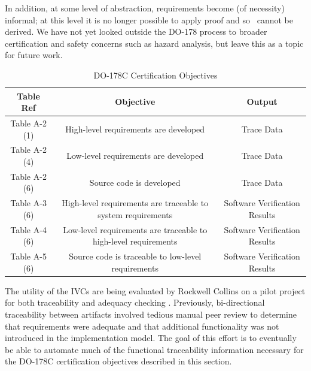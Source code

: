 In addition, at some level of abstraction, requirements become (of necessity) informal; at this level it is no longer possible to apply proof and so \mivcs\ cannot be derived.  We have not yet looked outside the DO-178 process to broader certification and safety concerns such as hazard analysis, but leave this as a topic for future work.

\begin{table}
  \caption{DO-178C Certification Objectives}
  \centering
  \begin{tabular}{ |c|c|c| }
    \hline
     Table Ref & Objective & Output  \\[0.5ex]
    \hline\hline
    Table A-2 (1) & High-level requirements are developed & Trace Data \\
    Table A-2 (4) & Low-level requirements are developed & Trace Data \\
    Table A-2 (6) & Source code is developed & Trace Data \\
    Table A-3 (6) & High-level requirements are traceable to system requirements & Software Verification Results \\
    Table A-4 (6) & Low-level requirements are traceable to high-level requirements & Software Verification Results \\
    Table A-5 (6) & Source code is traceable to low-level requirements & Software Verification Results \\
    \hline
  \end{tabular}
  \label{tab:do178c}
\end{table}

The utility of the IVCs are being evaluated by Rockwell Collins on a pilot project for both traceability and adequacy checking \cite{lucas17}. Previously, bi-directional traceability between artifacts involved tedious manual peer review to determine that requirements were adequate and that additional functionality was not introduced in the implementation model. The goal of this effort is to eventually be able to automate much of the functional traceability information necessary for the DO-178C certification objectives described in this section.

